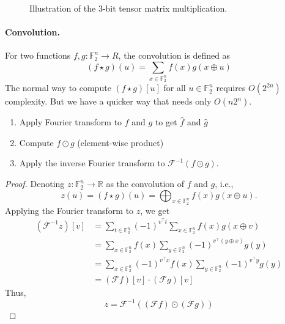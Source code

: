 \documentclass[12pt,journal=tosc, notanonymous]{iacrtrans}
\begin{document}
\begin{figure}
\begin{tikzpicture}


\end{tikzpicture}
\caption{Illustration of the 3-bit tensor matrix multiplication.}
\label{fig:tensor}
\end{figure}





\paragraph{Convolution.}
For two functions $f, g: \mathbb{F}_2^n \rightarrow R$, the convolution is defined as 
$$
(f \star g) (u) = \sum_{x \in \mathbb{F}_2^n} f(x) g(x \oplus u) 
$$
The normal way to compute $(f \star g)[u]$ for all $u \in \mathbb{F}_2^n$ requires $O(2^{2n})$ complexity.
But we have a quicker way that needs only $O(n2^{n})$.

\begin{enumerate}
    \item Apply Fourier transform to $f$ and $g$ to get $\hat{f}$ and $\hat{g}$
    \item Compute $f \odot g$ (element-wise product)
    \item Apply the inverse Fourier transform to $\mathcal{F}^{-1}(f \odot g)$.
    \end{enumerate}

\begin{proof}
Denoting $z: \mathbb{F}_2^n \rightarrow \mathbb{R}$ as the convolution of $f$ and $g$, i.e., 
$$
z(u) = (f \star g) (u) = \bigoplus_{x \in \mathbb{F}_2^n} f(x) g(x \oplus u).
$$
Applying the Fourier transform to $z$, we get 
$$
\begin{aligned}
( \mathcal{F}^{-1} z )[v] &= \sum_{t \in \mathbb{F}_2^n} (-1)^{v^\top t} \sum_{x \in \mathbb{F}_2^n} f(x) g(x \oplus v) \\
 &= \sum_{x \in \mathbb{F}_2^n} f(x) \sum_{y \in \mathbb{F}_2^n} (-1)^{v^\top (y\oplus x)}  g(y)\\
 &= \sum_{x \in \mathbb{F}_2^n} (-1)^{v^\top x} f(x) \sum_{y \in \mathbb{F}_2^n} (-1)^{v^\top y} g(y) \\
 & = ( \mathcal{F} f )[v] \cdot  ( \mathcal{F} g )[v]
\end{aligned}
$$
Thus, 
$$
z = \mathcal{F}^{-1} ( ( \mathcal{F} f ) \odot  ( \mathcal{F} g ) )
$$
\end{proof}
\end{document}
